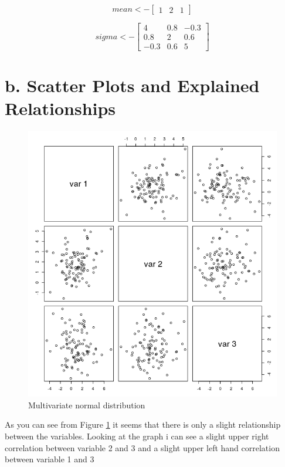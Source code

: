 \documentclass{report}
\begin{document}
\[
  mean <-
  \begin{bmatrix}
    1 & 2 & 1
  \end{bmatrix}
\]

\[
  sigma <-
  \begin{bmatrix}
    4 & 0.8 & -0.3 \\
    0.8 & 2 & 0.6 \\
    -0.3 & 0.6 & 5
  \end{bmatrix}
\]

\section{b. Scatter Plots and Explained Relationships}

\begin{figure}[H]
  \includegraphics[width=\linewidth]{mvnd_scatter_plot.png}
  \caption{Multivariate normal distribution}
  \label{fig:MND}
\end{figure}

\par
As you can see from Figure \ref{fig:MND} it seems that there is only a slight relationship between the variables. Looking at the graph i can see a slight upper right correlation between variable 2 and 3 and a slight upper left hand correlation between variable 1 and 3
\end{document}
